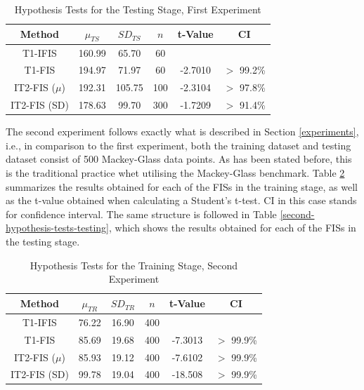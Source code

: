 \documentclass[conference]{IEEEtran}
\begin{document}
\begin{table}[!t]
  \renewcommand{\arraystretch}{1.3}
  \caption{Hypothesis Tests for the Testing Stage, First Experiment}
  \label{first-hypothesis-tests-testing}
  \centering
  \begin{tabular}{|c|c|c|c|c|c|}
    \hline
    Method & $\mu_{TS}$ & $SD_{TS}$ & $n$ & t-Value & CI \\
    \hline
    T1-IFIS & 160.99 & 65.70 & 60 &  & \\
    \hline
    T1-FIS & 194.97 & 71.97 & 60 & -2.7010 & $>$ 99.2\%\\
    \hline
    IT2-FIS (\(\mu\)) & 192.31 & 105.75 & 100 & -2.3104 & $>$ 97.8\% \\
    \hline
    IT2-FIS (SD) & 178.63 & 99.70 & 300 & -1.7209 & $>$ 91.4\% \\
    \hline
  \end{tabular}
\end{table}

The second experiment follows exactly what is described in Section
\ref{experiments}, i.e., in comparison to the first experiment, both the
training dataset and testing dataset consist of 500 Mackey-Glass data
points. As has been stated before, this is the traditional practice
whet utilising the Mackey-Glass benchmark. Table
\ref{second-hypothesis-tests-training} summarizes the results obtained
for each of the FISs in the training stage, as well as the t-value
obtained when calculating a Student's t-test. CI in this case stands
for confidence interval. The same structure is followed in Table
\ref{second-hypothesis-tests-testing}, which shows the
results obtained for each of the FISs in the testing stage.

\begin{table}[!t]
  \renewcommand{\arraystretch}{1.3}
  \caption{Hypothesis Tests for the Training Stage, Second Experiment}
  \label{second-hypothesis-tests-training}
  \centering
  \begin{tabular}{|c|c|c|c|c|c|}
    \hline
    Method & $\mu_{TR}$ & $SD_{TR}$ & $n$ & t-Value & CI\\
    \hline
    T1-IFIS & 76.22 & 16.90 & 400 & & \\
    \hline
    T1-FIS & 85.69 & 19.68 & 400 & -7.3013 & $>$ 99.9\% \\
    \hline
    IT2-FIS (\(\mu\)) & 85.93 & 19.12 & 400 & -7.6102 & $>$ 99.9\%\\
    \hline
    IT2-FIS (SD) & 99.78 & 19.04 & 400 & -18.508 & $>$ 99.9\% \\
    \hline
  \end{tabular}
\end{table}
\end{document}
